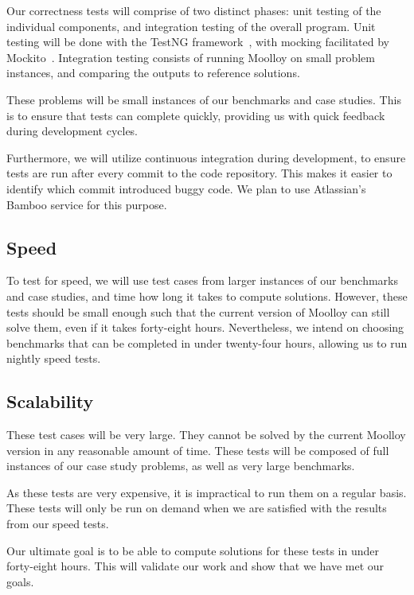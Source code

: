 \documentclass[11pt]{article}
\begin{document}
Our correctness tests will comprise of two distinct phases: unit
testing of the individual components, and integration testing of the
overall program. Unit testing will be done with the TestNG
framework~\cite{ref:testng}, with mocking facilitated by
Mockito~\cite{ref:mockito}. Integration testing consists of running
Moolloy on small problem instances, and comparing the outputs to
reference solutions.

These problems will be small instances of our benchmarks and case
studies. This is to ensure that tests can complete quickly, providing
us with quick feedback during development cycles.

Furthermore, we will utilize continuous integration during development,
to ensure tests are run after every commit to the code repository. This
makes it easier to identify which commit introduced buggy code. We plan
to use Atlassian's Bamboo service for this purpose.

\subsection{Speed}

To test for speed, we will use test cases from larger instances of our
benchmarks and case studies, and time how long it takes to compute
solutions. However, these tests should be small enough such that the
current version of Moolloy can still solve them, even if it takes
forty-eight hours. Nevertheless, we intend on choosing benchmarks that
can be completed in under twenty-four hours, allowing us to run nightly
speed tests.

\subsection{Scalability}

These test cases will be very large. They cannot be solved by the
current Moolloy version in any reasonable amount of time. These tests
will be composed of full instances of our case study problems, as well
as very large benchmarks.

As these tests are very expensive, it is impractical to run them on a
regular basis. These tests will only be run on demand when we are
satisfied with the results from our speed tests.

Our ultimate goal is to be able to compute solutions for these tests in
under forty-eight hours. This will validate our work and show that we
have met our goals.
\end{document}

